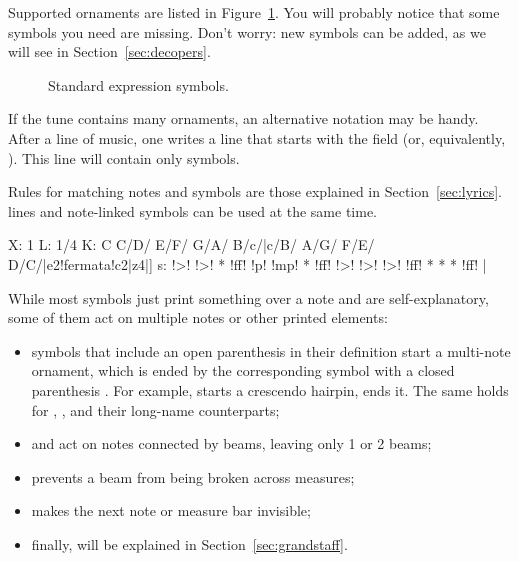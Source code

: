 \documentclass[a4paper,fullpage,12pt]{book}
\begin{document}
Supported ornaments are listed in Figure~\ref{fig:alldeco}. You will
probably notice that some symbols you need are missing. Don't worry:
new symbols can be added, as we will see in
Section~\ref{sec:decopers}.

\begin{center}
\begin{figure}[htbp]
\caption{Standard expression symbols.}
\label{fig:alldeco}
\end{figure}
\end{center}


If the tune contains many ornaments, an alternative notation may be
handy. After a line of music, one writes a line that starts with the
 field (or, equivalently, ). This line will
contain only symbols.

Rules for matching notes and symbols are those explained in
Section~\ref{sec:lyrics}.  lines and note-linked symbols can
be used at the same time.

\begin{abcsource}
X: 1
L: 1/4
K: C
C/D/ E/F/ G/A/ B/c/|c/B/ A/G/ F/E/ D/C/|e2!fermata!c2|z4|]
s: !>! !>! * !ff! !p! !mp! * !ff! !>! !>! !>! !ff! * * * !ff! |
\end{abcsource}


While most symbols just print something over a note and are
self-explanatory, some of them act on multiple notes or other printed
elements:

\begin{itemize}
  
  \item symbols that include an open parenthesis \car{(} in their
  definition start a multi-note ornament, which is ended by the
  corresponding symbol with a closed parenthesis \car{)}. For example,
  \cmd{!<(!} starts a crescendo hairpin, \cmd{!<)!} ends it. The same
  holds for \cmd{!>(!}, \cmd{!>)!}, and their long-name counterparts;
  
  \item {} and  act on notes connected by
  beams, leaving only 1 or 2 beams;
  
  \item {} prevents a beam from being broken across
  measures;
  
  \item {} makes the next note or measure bar
  invisible;
  
  \item finally,  will be explained in
  Section~\ref{sec:grandstaff}.
  
\end{itemize}
\end{document}
